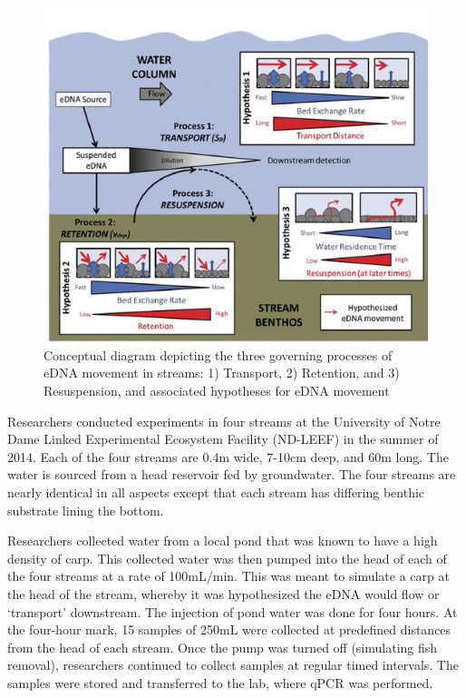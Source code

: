 \begin{figure}[H]
\includegraphics[scale=0.8]{Chapter2Images/ednatransport.png}
\caption{Conceptual diagram depicting the three governing processes of eDNA movement in streams: 1)
Transport, 2) Retention, and 3) Resuspension, and associated hypotheses for eDNA movement \citep{ednatransport}}
\label{fig:ednatransport}
\end{figure}

\vspace{3mm}

Researchers conducted experiments in four streams at the University of Notre Dame Linked Experimental Ecosystem Facility (ND-LEEF) in the summer of 2014. Each of the four streams are 0.4m wide, 7-10cm deep, and 60m long. The water is sourced from a head reservoir fed by groundwater. The four streams are nearly identical in all aspects except that each stream has differing benthic substrate lining the bottom.

\vspace{3mm}

Researchers collected water from a local pond that was known to have a high density of carp. This collected water was then pumped into the head of each of the four streams at a rate of 100mL/min. This was meant to simulate a carp at the head of the stream, whereby it was hypothesized the eDNA would flow or `transport' downstream. The injection of pond water was done for four hours. At the four-hour mark, 15 samples of 250mL were collected at predefined distances from the head of each stream. Once the pump was turned off (simulating fish removal), researchers continued to collect samples at regular timed intervals. The samples were stored and transferred to the lab, where qPCR was performed.

